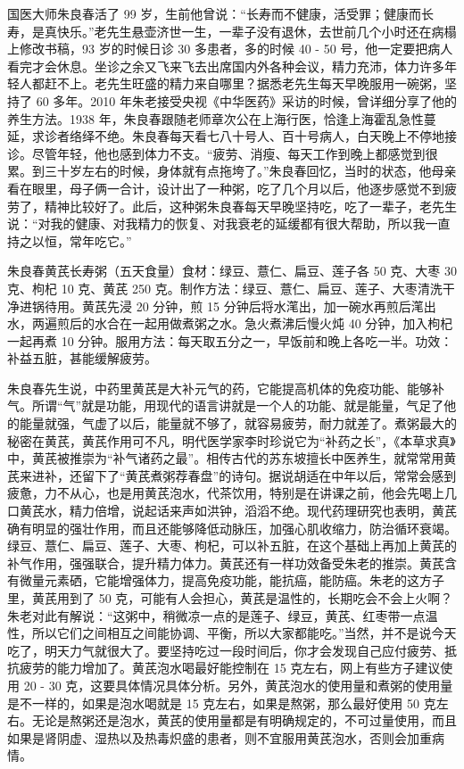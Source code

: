 国医大师朱良春活了 99 岁，生前他曾说：“长寿而不健康，活受罪；健康而长寿，是真快乐。”老先生悬壶济世一生，一辈子没有退休，去世前几个小时还在病榻上修改书稿，93 岁的时候日诊 30 多患者，多的时候 40 - 50 号，他一定要把病人看完才会休息。坐诊之余又飞来飞去出席国内外各种会议，精力充沛，体力许多年轻人都赶不上。老先生旺盛的精力来自哪里？据悉老先生每天早晚服用一碗粥，坚持了 60 多年。2010 年朱老接受央视《中华医药》采访的时候，曾详细分享了他的养生方法。1938 年，朱良春跟随老师章次公在上海行医，恰逢上海霍乱急性蔓延，求诊者络绎不绝。朱良春每天看七八十号人、百十号病人，白天晚上不停地接诊。尽管年轻，他也感到体力不支。“疲劳、消瘦、每天工作到晚上都感觉到很累。到三十岁左右的时候，身体就有点拖垮了。”朱良春回忆，当时的状态，他母亲看在眼里，母子俩一合计，设计出了一种粥，吃了几个月以后，他逐步感觉不到疲劳了，精神比较好了。此后，这种粥朱良春每天早晚坚持吃，吃了一辈子，老先生说：“对我的健康、对我精力的恢复、对我衰老的延缓都有很大帮助，所以我一直持之以恒，常年吃它。”

朱良春黄芪长寿粥（五天食量）食材：绿豆、薏仁、扁豆、莲子各 50 克、大枣 30 克、枸杞 10 克、黄芪 250 克。制作方法：绿豆、薏仁、扁豆、莲子、大枣清洗干净进锅待用。黄芪先浸 20 分钟，煎 15 分钟后将水滗出，加一碗水再煎后滗出水，两遍煎后的水合在一起用做煮粥之水。急火煮沸后慢火炖 40 分钟，加入枸杞一起再煮 10 分钟。服用方法：每天取五分之一，早饭前和晚上各吃一半。功效：补益五脏，甚能缓解疲劳。

朱良春先生说，中药里黄芪是大补元气的药，它能提高机体的免疫功能、能够补气。所谓“气”就是功能，用现代的语言讲就是一个人的功能、就是能量，气足了他的能量就强，气虚了以后，能量就不够了，就容易疲劳，耐力就差了。煮粥最大的秘密在黄芪，黄芪作用可不凡，明代医学家李时珍说它为“补药之长”，《本草求真》中，黄芪被推崇为“补气诸药之最”。相传古代的苏东坡擅长中医养生，就常常用黄芪来进补，还留下了“黄芪煮粥荐春盘”的诗句。据说胡适在中年以后，常常会感到疲惫，力不从心，也是用黄芪泡水，代茶饮用，特别是在讲课之前，他会先喝上几口黄芪水，精力倍增，说起话来声如洪钟，滔滔不绝。现代药理研究也表明，黄芪确有明显的强壮作用，而且还能够降低动脉压，加强心肌收缩力，防治循环衰竭。绿豆、薏仁、扁豆、莲子、大枣、枸杞，可以补五脏，在这个基础上再加上黄芪的补气作用，强强联合，提升精力体力。黄芪还有一样功效备受朱老的推崇。黄芪含有微量元素硒，它能增强体力，提高免疫功能，能抗癌，能防癌。朱老的这方子里，黄芪用到了 50 克，可能有人会担心，黄芪是温性的，长期吃会不会上火啊？朱老对此有解说：“这粥中，稍微凉一点的是莲子、绿豆，黄芪、红枣带一点温性，所以它们之间相互之间能协调、平衡，所以大家都能吃。”当然，并不是说今天吃了，明天力气就很大了。要坚持吃过一段时间后，你才会发现自己应付疲劳、抵抗疲劳的能力增加了。黄芪泡水喝最好能控制在 15 克左右，网上有些方子建议使用 20 - 30 克，这要具体情况具体分析。另外，黄芪泡水的使用量和煮粥的使用量是不一样的，如果是泡水喝就是 15 克左右，如果是熬粥，那么最好使用 50 克左右。无论是熬粥还是泡水，黄芪的使用量都是有明确规定的，不可过量使用，而且如果是肾阴虚、湿热以及热毒炽盛的患者，则不宜服用黄芪泡水，否则会加重病情。

